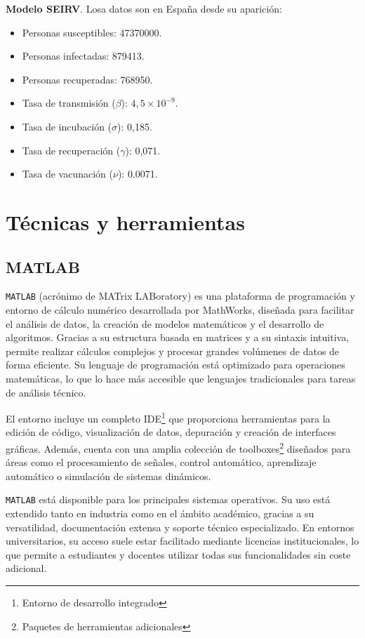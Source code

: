 \textbf{Modelo SEIRV}.
Losa datos son en España desde su aparición:

\begin{itemize}
    \item Personas susceptibles: 47370000.
    \item Personas infectadas: 879413.
    \item Personas recuperadas: 768950.
    \item Tasa de transmisión ($\beta$): $4,5 \times 10^{-9}$.
    \item Tasa de incubación ($\sigma$): 0,185.
    \item Tasa de recuperación ($\gamma$): 0,071. 
    \item Tasa de vacunación ($\nu$): 0.0071.
\end{itemize}





\section{Técnicas y herramientas}

\subsection{MATLAB}
\texttt{MATLAB} (acrónimo de MATrix LABoratory) \cite{mathworks_matlab} es una plataforma de programación y entorno de cálculo numérico desarrollada por MathWorks, diseñada para facilitar el análisis de datos, la creación de modelos matemáticos y el desarrollo de algoritmos. Gracias a su estructura basada en matrices y a su sintaxis intuitiva, permite realizar cálculos complejos y procesar grandes volúmenes de datos de forma eficiente. Su lenguaje de programación está optimizado para operaciones matemáticas, lo que lo hace más accesible que lenguajes tradicionales para tareas de análisis técnico.

El entorno incluye un completo IDE\footnote{Entorno de desarrollo integrado} que proporciona herramientas para la edición de código, visualización de datos, depuración y creación de interfaces gráficas. Además, cuenta con una amplia colección de toolboxes\footnote{Paquetes de herramientas adicionales} diseñados para áreas como el procesamiento de señales, control automático, aprendizaje automático o simulación de sistemas dinámicos.

\texttt{MATLAB} está disponible para los principales sistemas operativos. Su uso está extendido tanto en industria como en el ámbito académico, gracias a su versatilidad, documentación extensa y soporte técnico especializado. En entornos universitarios, su acceso suele estar facilitado mediante licencias institucionales, lo que permite a estudiantes y docentes utilizar todas sus funcionalidades sin coste adicional.

